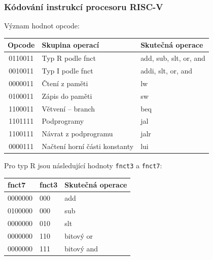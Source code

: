 \begin{frame}
\frametitle{Kódování instrukcí procesoru RISC-V}

Význam hodnot opcode:
\begin{table}
\footnotesize
\begin{tabular}{|c|l|l|}\hline
Opcode & Skupina operací & Skutečná operace \\ \hline
0110011 & Typ R podle fnct & add, sub, slt, or, and \\ \hline
0010011 & Typ I podle fnct & addi, slt, or, and \\ \hline
0000011 & Čtení z paměti & lw \\ \hline
0100011 & Zápis do paměti & sw \\ \hline
1100011 & Větvení -- branch & beq \\ \hline
1101111 & Podprogramy & jal \\ \hline
1100111 & Návrat z podprogramu & jalr \\ \hline
0000111 & Načtení horní části konstanty & lui \\ \hline
\end{tabular}
\end{table}

Pro typ R jsou následující hodnoty \texttt{fnct3} a \texttt{fnct7}:
\begin{table}
\footnotesize
\begin{tabular}{|l|l|l|}\hline
fnct7 & fnct3 & Skutečná operace \\ \hline
0000000 & 000  & add \\ \hline
0100000 & 000  & sub \\ \hline
0000000 & 010  & slt \\ \hline
0000000 & 110  & bitový or \\ \hline
0000000 & 111  & bitový and \\ \hline
\end{tabular}
\end{table}

\end{frame}
